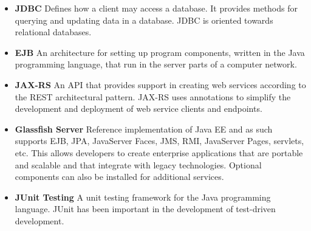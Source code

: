 \begin{itemize}
			\item \textbf{JDBC} Defines how a client may access a database. It provides methods for querying and updating data in a database. JDBC is oriented towards relational databases.
			
			\item \textbf{EJB} An architecture for setting up program components, written in the Java programming language, that run in the server parts of a computer network.
			
			\item \textbf{JAX-RS} An API that provides support in creating web services according to the REST architectural pattern. JAX-RS uses annotations to simplify the development and deployment of web service clients and endpoints.
			
			\item \textbf{Glassfish Server}  Reference implementation of Java EE and as such supports EJB, JPA, JavaServer Faces, JMS, RMI, JavaServer Pages, servlets, etc. This allows developers to create enterprise applications that are portable and scalable and that integrate with legacy technologies. Optional components can also be installed for additional services.
			
			\item \textbf{JUnit Testing} A unit testing framework for the Java programming language. JUnit has been important in the development of test-driven development.
		
\end{itemize}